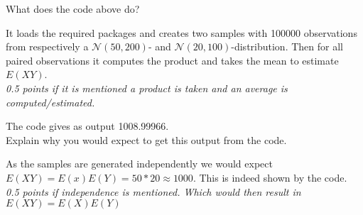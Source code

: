 \begin{exercise}[0.5]
What does the code above do?
\begin{solution}
It loads the required packages and creates two samples with 100000 observations from respectively a $\mathcal{N}(50, 200)$- and $\mathcal{N}(20,100)$-distribution. Then for all paired observations it computes the product and takes the mean to estimate $E(XY)$. \\
\textit{0.5 points if it is mentioned a product is taken and an average is computed/estimated.}
\end{solution}
\end{exercise}
\begin{exercise}[0.5]
The code gives as output 1008.99966. \\
Explain why you would expect to get this output from the code.
\begin{solution}
As the samples are generated independently we would expect $E(XY) = E(x)E(Y) = 50*20 \approx 1000$. This is indeed shown by the code. \\
\textit{0.5 points if independence is mentioned. Which would then result in $E(XY) = E(X)E(Y)$}
\end{solution}
\end{exercise}